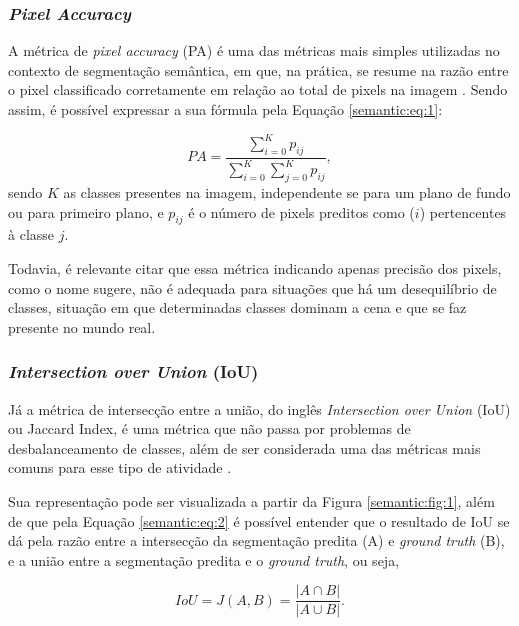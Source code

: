 \subsubsection{\textit{Pixel Accuracy}}
\label{semantic:pa}
A métrica de \textit{pixel accuracy} (PA) é uma das métricas mais simples utilizadas no contexto de segmentação semântica, em que, na prática, se resume na razão entre o pixel classificado corretamente em relação ao total de pixels na imagem \cite{Minaee2021}. Sendo assim, é possível expressar a sua fórmula pela Equação \ref{semantic:eq:1}:

\begin{equation}
    \label{semantic:eq:1}
    PA = \frac{\sum_{i=0}^{K} p_{ij}}{\sum_{i=0}^{K} \sum_{j=0}^{K} p_{ij}},
\end{equation}
sendo $K$ as classes presentes na imagem, independente se para um plano de fundo ou para primeiro plano, e $p_{ij}$ é o número de pixels preditos como ($i$) pertencentes à classe $j$.

Todavia, é relevante citar que essa métrica indicando apenas precisão dos pixels, como o nome sugere, não é adequada para situações que há um desequilíbrio de classes, situação em que determinadas classes dominam a cena e que se faz presente no mundo real.


\subsubsection{\textit{Intersection over Union} (IoU)}
\label{semantic:IoU}
Já a métrica de intersecção entre a união, do inglês \textit{Intersection over Union} (IoU) ou Jaccard Index, é uma métrica que não passa por problemas de desbalanceamento de classes, além de ser considerada uma das métricas mais comuns para esse tipo de atividade \cite{Minaee2021}.

Sua representação pode ser visualizada a partir da Figura \ref{semantic:fig:1}, além de que pela Equação \ref{semantic:eq:2} é possível entender que o resultado de IoU se dá pela razão entre a intersecção da segmentação predita (A) e \textit{ground truth} (B), e a união entre a segmentação predita e o \textit{ground truth}, ou seja,

\begin{equation}
    \label{semantic:eq:2}
    IoU = J(A,B) = \frac{|A \cap B|}{|A \cup B|}.
\end{equation}

